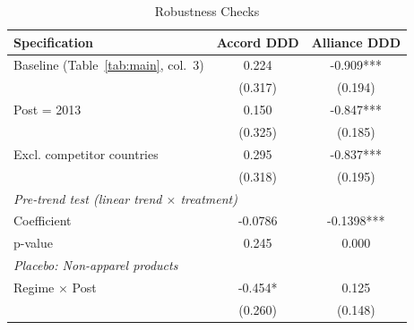\begin{table}[t]
\centering
\caption{Robustness Checks}
\label{tab:robustness}
\begin{tabular}{lcc}
\toprule
Specification & Accord DDD & Alliance DDD \\
\midrule
Baseline (Table~\ref{tab:main}, col.~3) & 0.224 & -0.909*** \\
 & (0.317) & (0.194) \\
Post = 2013 & 0.150 & -0.847*** \\
 & (0.325) & (0.185) \\
Excl. competitor countries & 0.295 & -0.837*** \\
 & (0.318) & (0.195) \\
\midrule
\multicolumn{3}{l}{\textit{Pre-trend test (linear trend $\times$ treatment)}} \\
Coefficient & -0.0786 & -0.1398*** \\
p-value & 0.245 & 0.000 \\
\midrule
\multicolumn{3}{l}{\textit{Placebo: Non-apparel products}} \\
Regime $\times$ Post & -0.454* & 0.125 \\
 & (0.260) & (0.148) \\
\bottomrule
\end{tabular}
\par{}
\end{table}

